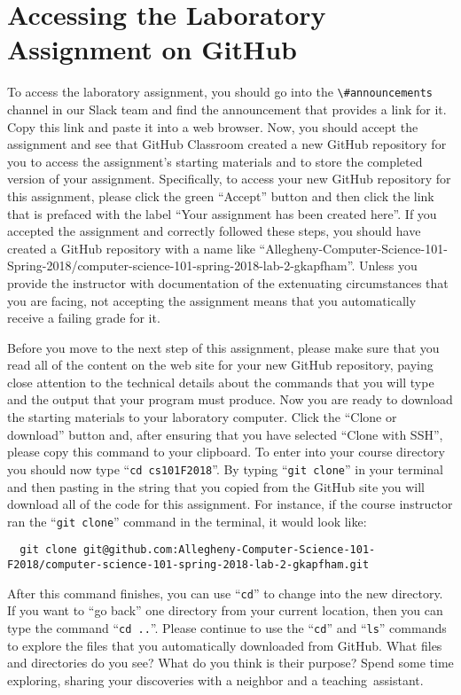 \documentclass[11pt]{article}
\newcommand{\command}[1]{``\lstinline{#1}''}
\newcommand{\channel}[1]{\lstinline{#1}}
\newcommand{\step}[1]{``{#1}''}
\begin{document}
\section*{Accessing the Laboratory Assignment on GitHub}

To access the laboratory assignment, you should go into the
\channel{\#announcements} channel in our Slack team and find the announcement
that provides a link for it. Copy this link and paste it into a web browser.
Now, you should accept the assignment and see that GitHub Classroom created a
new GitHub repository for you to access the assignment's starting materials and
to store the completed version of your assignment. Specifically, to access your
new GitHub repository for this assignment, please click the green ``Accept''
button and then click the link that is prefaced with the label ``Your assignment
has been created here''. If you accepted the assignment and correctly followed
these steps, you should have created a GitHub repository with a name like
``Allegheny-Computer-Science-101-Spring-2018/computer-science-101-spring-2018-lab-2-gkapfham''.
Unless you provide the instructor with documentation of the extenuating
circumstances that you are facing, not accepting the assignment means that you
automatically receive a failing grade for it.

Before you move to the next step of this assignment, please make sure that you
read all of the content on the web site for your new GitHub repository, paying
close attention to the technical details about the commands that you will type
and the output that your program must produce. Now you are ready to download the
starting materials to your laboratory computer. Click the ``Clone or download''
button and, after ensuring that you have selected ``Clone with SSH'', please
copy this command to your clipboard. To enter into your course directory you
should now type \command{cd cs101F2018}. By typing \command{git clone} in your
terminal and then pasting in the string that you copied from the GitHub site you
will download all of the code for this assignment. For instance, if the course
instructor ran the \command{git clone} command in the terminal, it would look
like:

\begin{lstlisting}
  git clone git@github.com:Allegheny-Computer-Science-101-F2018/computer-science-101-spring-2018-lab-2-gkapfham.git
\end{lstlisting}

After this command finishes, you can use \command{cd} to change into the new directory. If you want to \step{go back}
one directory from your current location, then you can type the command \command{cd ..}. Please continue to use the
\command{cd} and \command{ls} commands to explore the files that you automatically downloaded from GitHub. What files
and directories do you see? What do you think is their purpose? Spend some time exploring, sharing your discoveries with
a neighbor and a \mbox{teaching assistant}.
\end{document}
